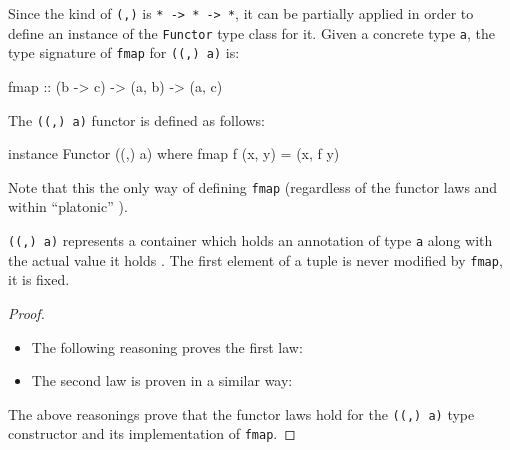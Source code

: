 \begin{example}[\texttt{((,) a)}]
  \label{ex:functors-haskell-product}
  Since the kind of \texttt{(,)} is \texttt{* -> * -> *}, it can be
  partially applied in order to define an instance of the
  \texttt{Functor} type class for it. Given a concrete type
  \texttt{a}, the type signature of \texttt{fmap} for \texttt{((,) a)}
  is:
  \begin{codehaskell}
    fmap :: (b -> c) -> (a, b) -> (a, c)
  \end{codehaskell}

  The \texttt{((,) a)} functor is defined as follows:
  \begin{codehaskell}
    instance Functor ((,) a) where
      fmap f (x, y) = (x, f y)
  \end{codehaskell}
  Note that this the only way of defining \texttt{fmap} (regardless of
  the functor laws and within ``platonic'' \hask).

  \texttt{((,) a)} represents a container which holds an annotation of
  type \texttt{a} along with the actual value it holds
  \parencite{yorgey-2009}. The first element of a tuple is never
  modified by \texttt{fmap}, it is fixed.


  \begin{proof}
    \hfill
    \begin{itemize}
    \item
      The following reasoning proves the first law:
      \begin{steps}
      \end{steps}
    \item
      The second law is proven in a similar way:
      \begin{steps}
      \end{steps}
    \end{itemize}
    The above reasonings prove that the functor laws hold for the
    \texttt{((,) a)} type constructor and its implementation of
    \texttt{fmap}.
  \end{proof}
\end{example}

